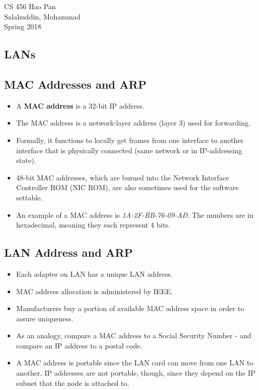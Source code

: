 \documentclass{article}
\begin{document}
\noindent
{CS 456 \hfill Hao Pan}\\
{Salahuddin, Mohammad}\\
{Spring 2018}


\begin{center}
\section{LANs}
\noindent
\end{center}

\subsection{MAC Addresses and ARP}

\begin{itemize}
\item A {\bf MAC address} is a 32-bit IP address.
\item The MAC address is a network-layer address (layer 3) used for forwarding.
\item Formally, it functions to locally get frames from one interface to another interface that is physically connected (same network or in IP-addressing state).
\item 48-bit MAC addresses, which are burned into the Network Interface Controller ROM (NIC ROM), are also sometimes used for the software settable.
\item An example of a MAC address is \emph{1A-2F-BB-76-09-AD}. The numbers are in hexadecimal, meaning they each represent 4 bits.
\end{itemize}

\subsection{LAN Address and ARP}

\begin{itemize}
\item Each adapter on LAN has a unique LAN address.
\item MAC address allocation is administered by IEEE.
\item Manufacturers buy a portion of available MAC address space in order to assure uniqueness.
\item As an analogy, compare a MAC address to a Social Security Number - and compare an IP address to a postal code.
\item A MAC address is portable since the LAN card can move from one LAN to another. IP addresses are not portable, though, since they depend on the IP subnet that the node is attached to.
\end{itemize}
\end{document}
